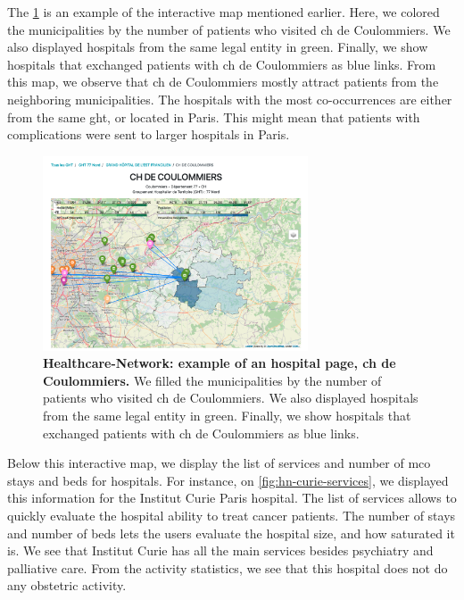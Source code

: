 The \cref{fig:hn-coulommiers-co-occ} is an example of the interactive map
mentioned earlier. Here, we colored the municipalities by the number of patients
who visited \ac{ch} de Coulommiers. We also displayed hospitals from the same
legal entity in green. Finally, we show hospitals that exchanged patients with
\ac{ch} de Coulommiers as blue links. From this map, we observe that \ac{ch} de
Coulommiers mostly attract patients from the neighboring municipalities. The
hospitals with the most co-occurrences are either from the same \ac{ght}, or
located in Paris. This might mean that patients with complications were sent to
larger hospitals in Paris.

\begin{figure}[h]
    \includegraphics[width=0.7\textwidth]{images/healthcare-network/coulommiers-co-occ.png}
    \centering
    \caption{ \textbf{Healthcare-Network: example of an hospital page, \acf{ch}
            de Coulommiers.} We filled the municipalities by the number of patients
        who visited \ac{ch} de Coulommiers. We also displayed hospitals from the
        same legal entity in green. Finally, we show hospitals that exchanged
        patients with \ac{ch} de Coulommiers as blue links. }
    \label{fig:hn-coulommiers-co-occ}
\end{figure}

Below this interactive map, we display the list of services and number of
\ac{mco} stays and beds for hospitals. For instance, on
\cref{fig:hn-curie-services}, we displayed this information for the Institut
Curie Paris hospital. The list of services allows to quickly evaluate the
hospital ability to treat cancer patients. The number of stays and number of
beds lets the users evaluate the hospital size, and how saturated it is. We see
that Institut Curie has all the main services besides psychiatry and palliative
care. From the activity statistics, we see that this hospital does not do any
obstetric activity.

